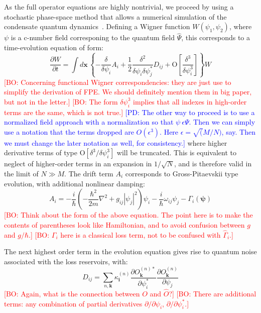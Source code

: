 \documentclass[aps,prl,twocolumn,showpacs,amsmath,amssymb,superscriptaddress]{revtex4-1}
\newcommand{\bogdansremark}[1]{\textcolor{red}{{[}BO: #1{]}}}
\newcommand{\petersremark}[1]{\textcolor{blue}{{[}PD: #1{]}}}
\newcommand{\bx}{\boldsymbol{x}}
\begin{document}
As the full operator equations are highly nontrivial,
we proceed by using a stochastic phase-space method
that allows a numerical simulation of the condensate quantum dynamics~\cite{Drummond1993, Steel1998}.
Defining a Wigner function $W\left(\psi_{1},\psi_{2}\right)$,
where $\psi$ is a c-number field corresponing to the quantum field $\hat{\Psi}$,
this corresponds to a time-evolution equation of form:
\begin{equation}
	\frac{\partial W}{\partial t} = \int d\bx\,\left\{
		-\frac{\delta}{\delta\psi_{i}} A_{i} +
		\frac{1}{2} \frac{\delta^{2}}{\delta\psi_{i} \delta\psi_{j}^{*}}D_{ij} +
		\mbox{O} \left[ \frac{\delta^{3}}{\delta\psi_{i}^{3}} \right]
	\right\} W
\end{equation}
	\bogdansremark{Concerning functional Wigner correspondencies:
	they are just use to simplify the derivation of FPE.
	We should definitely mention them in big paper, but not in the letter.}
	\bogdansremark{The form $\delta\psi_{i}^{3}$ implies that all indexes in high-order terms
	are the same, which is not true.}
	\petersremark{The other way to proceed is to use a normalized field approach
	with a normalization so that $\psi ~ \epsilon\Psi$.
	Then we can simply use a notation that the terms dropped are $O(\epsilon^3)$.
	Here $\epsilon = \sqrt(M/N)$, say.
	Then we must change the later notation as well, for consistency.}
where higher derivative terms of type $\mbox{O}\left[\delta^3/\delta\psi_{i}^{3}\right]$
will be truncated.
This is equivalent to neglect of higher-order terms in an expansion in $1/\sqrt{N}$,
and is therefore valid in the limit of $N \gg M$.
The drift term $A_{i}$ corresponds to Gross-Pitaevskii type evolution,
with additional nonlinear damping:
\begin{equation}
	A_{i} = -\frac{i}{\hbar} \left(
	 	-\frac{\hbar^2}{2m} \nabla^{2} + g_{ij} \left| \psi_{j} \right|^{2}
	\right) \psi_{i} -
	\frac{i}{\hbar} \omega_{ij} \psi_{j} -
	\Gamma_{i} \left( \boldsymbol{\psi} \right)
\end{equation}
	\bogdansremark{Think about the form of the above equation.
	The point here is to make the contents of parentheses look like Hamiltonian,
	and to avoid confusion between $g$ and $g / \hbar$.}
	\bogdansremark{$\Gamma_{i}$ here is a classical loss term,
	not to be confused with $\hat{\Gamma}_{i}$.}

The next highest order term in the evolution equation gives rise to
quantum noise associated with the loss reservoirs,
with:
\begin{equation}
	D_{ij} = \sum_{n,\mathbf{k}} \kappa_{\mathbf{i}}^{(n)}
	\frac{\partial O_{\mathbf{k}}^{(n)*}}{\partial\psi_{i}^{*}}
	\frac{\partial O_{\mathbf{k}}^{(n)}}{\partial\psi_{j}}
\end{equation}
	\bogdansremark{Again, what is the connection between $O$ and $\hat{O}$?}
	\bogdansremark{There are additional terms: any combination of partial derivatives
	$\partial/\partial\psi_{i}$, $\partial/\partial\psi_{i}^*$.}
\end{document}
